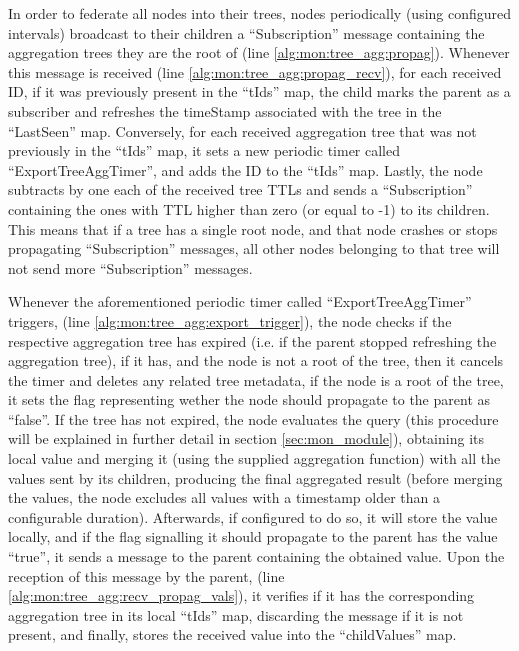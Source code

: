 In order to federate all nodes into their trees, nodes periodically (using configured intervals) broadcast to their children a ``Subscription'' message containing the aggregation trees they are the root of (line \ref{alg:mon:tree_agg:propag}). Whenever this message is received (line \ref{alg:mon:tree_agg:propag_recv}), for each received ID, if it was previously present in the ``tIds'' map, the child marks the parent as a subscriber and refreshes the timeStamp associated with the tree in the ``LastSeen'' map. Conversely, for each received aggregation tree that was not previously in the ``tIds'' map, it sets a new periodic timer called ``ExportTreeAggTimer'', and adds the ID to the ``tIds'' map. Lastly, the node subtracts by one each of the received tree TTLs and sends a ``Subscription'' containing the ones with TTL higher than zero (or equal to -1) to its children. This means that if a tree has a single root node, and that node crashes or stops propagating ``Subscription'' messages, all other nodes belonging to that tree will not send more ``Subscription'' messages.

Whenever the aforementioned periodic timer called ``ExportTreeAggTimer'' triggers, (line \ref{alg:mon:tree_agg:export_trigger}), the node checks if the respective aggregation tree has expired (i.e. if the parent stopped refreshing the aggregation tree), if it has, and the node is not a root of the tree, then it cancels the timer and deletes any related tree metadata, if the node is a root of the tree, it sets the flag representing wether the node should propagate to the parent as ``false''. If the tree has not expired, the node evaluates the query (this procedure will be explained in further detail in section \ref{sec:mon_module}), obtaining its local value and merging it (using the supplied aggregation function) with all the values sent by its children, producing the final aggregated result (before merging the values, the node excludes all values with a timestamp older than a configurable duration). Afterwards, if configured to do so, it will store the value locally, and if the flag signalling it should propagate to the parent has the value ``true'', it sends a message to the parent containing the obtained value. Upon the reception of this message by the parent, (line \ref{alg:mon:tree_agg:recv_propag_vals}), it verifies if it has the corresponding aggregation tree in its local ``tIds'' map, discarding the message if it is not present, and finally, stores the received value into the ``childValues'' map.


